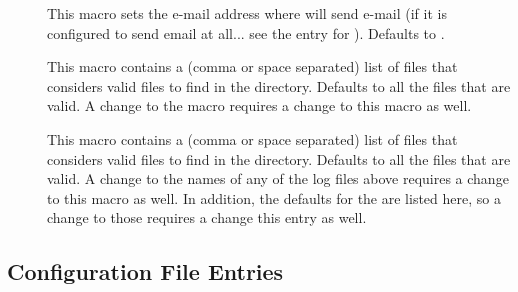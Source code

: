 \begin{description}

\item[] \label{param:PreenAdmin}  This macro
  sets the e-mail address where  will send e-mail (if
  it is configured to send email at all... see the entry for
  ).  Defaults to .

\item[] \label{param:ValidSpoolFiles}  This
  macro contains a (comma or space separated) list of files that
   considers valid files to find in the 
  directory.  Defaults to all the files that are valid.  A change
  to the  macro requires a change to this
  macro as well.
  
\item[] \label{param:ValidLogFiles} This
  macro contains a (comma or space separated) list of files that
   considers valid files to find in the 
  directory.  Defaults to all the files that are valid.  A change
  to the names of any of the log files above requires a change to this
  macro as well.  In addition, the defaults for the
   are listed here, so a change to
  those requires a change this entry as well.

\end{description}


\subsection{\label{sec:Collector-Config-File-Entries}
 Configuration File Entries}

